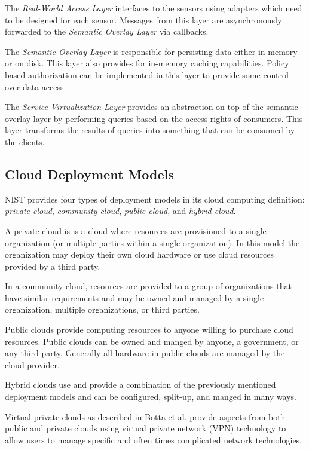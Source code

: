\documentclass[]{article}
\begin{document}
The \textit{Real-World Access Layer} interfaces to the sensors using adapters which need to be designed for each sensor. Messages from this layer are asynchronously forwarded to the \textit{Semantic Overlay Layer} via callbacks.

The \textit{Semantic Overlay Layer} is responsible for persisting data either in-memory or on disk. This layer also provides for in-memory caching capabilities. Policy based authorization can be implemented in this layer to provide some control over data access.

The \textit{Service Virtualization Layer} provides an abstraction on top of the semantic overlay layer by performing queries based on the access rights of consumers. This layer transforms the results of queries into something that can be consumed by the clients.


\subsection{Cloud Deployment Models} \label{ssec:cloud-deployment-models}
NIST\cite{mell2011nist} provides four types of deployment models in its cloud computing definition: \textit{private cloud}, \textit{community cloud}, \textit{public cloud}, and \textit{hybrid cloud}.

A private cloud is is a cloud where resources are provisioned to a single organization (or multiple parties within a single organization). In this model the organization may deploy their own cloud hardware or use cloud resources provided by a third party.

In a community cloud, resources are provided to a group of organizations that have similar requirements and may be owned and managed by a single organization, multiple organizations, or third parties.

Public clouds provide computing resources to anyone willing to purchase cloud resources. Public clouds can be owned and manged by anyone, a government, or any third-party. Generally all hardware in public clouds are managed by the cloud provider.

Hybrid clouds use and provide a combination of the previously mentioned deployment models and can be configured, split-up, and manged in many ways.

Virtual private clouds as described in Botta et al.\cite{botta_integration_2016} provide aspects from both public and private clouds using virtual private network (VPN) technology to allow users to manage specific and often times complicated network technologies.
\end{document}
